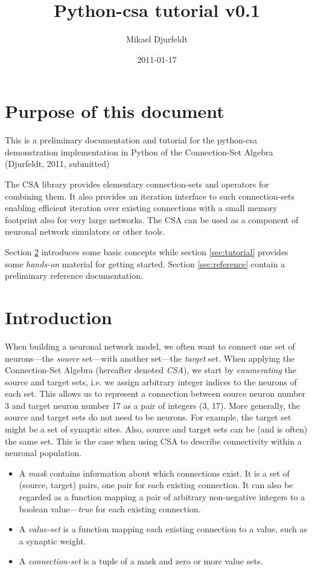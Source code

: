\documentclass[a4paper,twoside]{report}
\title{Python-csa tutorial v0.1}
\author{Mikael Djurfeldt}
\date{2011-01-17}
\begin{document}
\maketitle

\tableofcontents

\chapter{Purpose of this document}
This is a preliminary documentation and tutorial for the python-csa
demonstration implementation in Python of the Connection-Set Algebra
(Djurfeldt, 2011, submitted)

The CSA library provides elementary connection-sets and operators for
combining them. It also provides an iteration interface to such
connection-sets enabling efficient iteration over existing connections
with a small memory footprint also for very large networks. The CSA
can be used as a component of neuronal network simulators or other
tools.

Section \ref{sec:introduction} introduces some basic concepts while
section \ref{sec:tutorial} provides some \emph{hands-on} material for
getting started.  Section \ref{sec:reference} contain a preliminary
reference documentation.

\chapter{Introduction}\label{sec:introduction}
When building a neuronal network model, we often want to connect one
set of neurons---the \emph{source} set---with another set---the
\emph{target} set.  When applying the Connection-Set Algebra
(hereafter denoted \emph{CSA}), we start by \emph{enumerating} the
source and target sets, i.e. we assign arbitrary integer indices to
the neurons of each set.  This allows us to represent a connection
between source neuron number 3 and target neuron number 17 as a pair
of integers (3, 17).  More generally, the source and target sets do
not need to be neurons.  For example, the target set might be a set of
synaptic sites.  Also, source and target sets can be (and is often)
the same set.  This is the case when using CSA to describe
connectivity within a neuronal population.

\begin{itemize}
\item A \emph{mask} contains information about which connections exist.  It
is a set of (source, target) pairs, one pair for each existing
connection.  It can also be regarded as a function mapping a pair of
arbitrary non-negative integers to a boolean value---\emph{true} for
each existing connection.
\item A \emph{value-set} is a function mapping each existing
connection to a value, such as a synaptic weight.
\item A \emph{connection-set} is a tuple of a mask and zero or more
  value sets.
\end{itemize}
\end{document}
